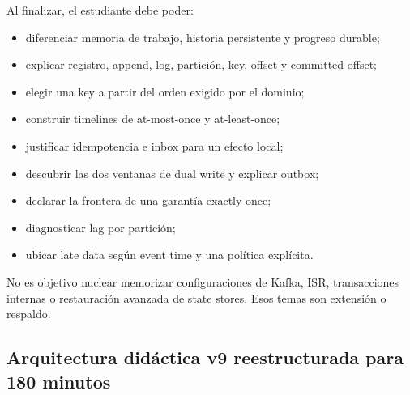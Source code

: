 \documentclass[variant=docente,cover=institutional,mode=screen]{ua-engineering-v6-article}
\begin{document}
Al finalizar, el estudiante debe poder:
\begin{itemize}
\item diferenciar memoria de trabajo, historia persistente y progreso durable;
\item explicar registro, append, log, partición, key, offset y committed offset;
\item elegir una key a partir del orden exigido por el dominio;
\item construir timelines de at-most-once y at-least-once;
\item justificar idempotencia e inbox para un efecto local;
\item descubrir las dos ventanas de dual write y explicar outbox;
\item declarar la frontera de una garantía exactly-once;
\item diagnosticar lag por partición;
\item ubicar late data según event time y una política explícita.
\end{itemize}

No es objetivo nuclear memorizar configuraciones de Kafka, ISR, transacciones internas o restauración avanzada de state stores. Esos temas son extensión o respaldo.

\subsection{Arquitectura didáctica v9 reestructurada para 180 minutos}
\end{document}
